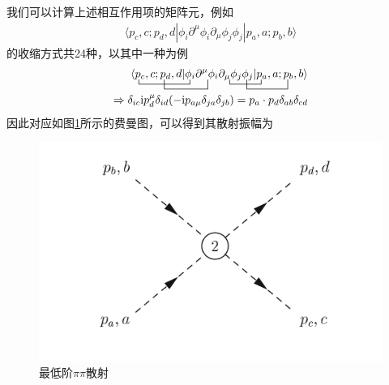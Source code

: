 \documentclass[aps,tightenlines,16pt]{ctexart}
\numberwithin{equation}{section}
\begin{document}
我们可以计算上述相互作用项的矩阵元，例如
\begin{align}
   \langle p_c,c;p_d,d|\phi_i\partial^{\mu}\phi_i\partial_{\mu}\phi_j\phi_j|p_a,a;p_b,b\rangle
\end{align}
的收缩方式共24种，以其中一种为例
\begin{align*}
   \begin{aligned}
   \bcontraction[1ex]{p}{_c}{,c;p_d,d|\phi}{_i}
   \bcontraction[1ex]{p_c,c;p_d,d|\phi_i\partial^{\mu}\phi_i\partial_{\mu}}{\phi}{_j\phi_j|p}{_a}
   \bcontraction[2ex]{p_c,c;p}{_d}{,d|\phi_i\partial^{\mu}}{\phi}
   \bcontraction[2ex]{p_c,c;p_d,d|\phi_i\partial^{\mu}\phi_i\partial_{\mu}\phi_j\phi}{_j}{|p_a,a;p}{_b}
   \langle p_c,c;p_d,d|\phi_i\partial^{\mu}\phi_i\partial_{\mu}\phi_j\phi_j|p_a,a;p_b,b\rangle\\
   \Rightarrow \delta_{ic}\mbox{i}p_{d}^{\mu}\delta_{id}(-\mbox{i}p_{a\mu}\delta_{ja}\delta_{jb})=
   p_a \cdot p_d \delta_{ab}\delta_{cd}
   \end{aligned}
\end{align*}
因此对应如图\ref{pipi}所示的费曼图，可以得到其散射振幅为
\begin{figure}
   \centering
   \includegraphics[scale=0.4]{l2pipi.png}
   \caption{最低阶$\pi\pi$散射}\label{pipi}
\end{figure}
\end{document}
